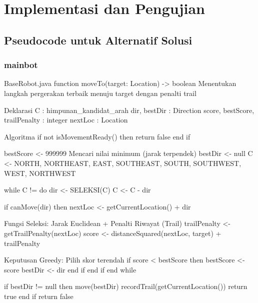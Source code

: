 \section{Implementasi dan Pengujian}

\subsection{Pseudocode untuk Alternatif Solusi}

\subsubsection{mainbot}

\begin{pseudocode}{BaseRobot.java}
    function moveTo(target: Location) -> boolean
    { Menentukan langkah pergerakan terbaik menuju target dengan penalti trail }

    { Deklarasi }
    C : himpunan_kandidat_arah
    dir, bestDir : Direction
    score, bestScore, trailPenalty : integer
    nextLoc : Location

    { Algoritma }
    if not isMovementReady() then return false end if
    
    bestScore <- 999999 { Mencari nilai minimum (jarak terpendek) }
    bestDir <- null
    C <- {NORTH, NORTHEAST, EAST, SOUTHEAST, SOUTH, SOUTHWEST, WEST, NORTHWEST}

    while C != {} do
        dir <- SELEKSI(C)
        C <- C - {dir}
        
        if canMove(dir) then
            nextLoc <- getCurrentLocation() + dir
            
            { Fungsi Seleksi: Jarak Euclidean + Penalti Riwayat (Trail) }
            trailPenalty <- getTrailPenalty(nextLoc)
            score <- distanceSquared(nextLoc, target) + trailPenalty
            
            { Keputusan Greedy: Pilih skor terendah }
            if score < bestScore then
                bestScore <- score
                bestDir <- dir
            end if
        end if
    end while

    if bestDir != null then
        move(bestDir)
        recordTrail(getCurrentLocation())
        return true
    end if
    return false
\end{pseudocode}

